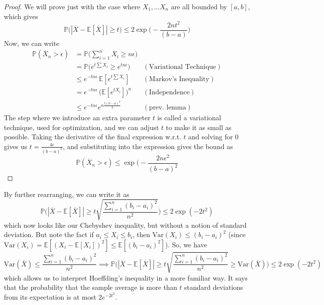 \documentclass{article}
\begin{document}
      \begin{proof}
        We will prove just with the case where $X_1, \ldots X_n$ are all bounded by $[a, b]$, which gives 
        \[\mathbb{P} \big( |\overline{X} - \mathbb{E}[\overline{X}] | \geq t \big) \leq 2 \exp \bigg( - \frac{2 n t^2}{(b - a)}\bigg)\] 
        Now, we can write 
        \begin{align*}
          \mathbb{P}(\overline{X}_n > \epsilon ) & = \mathbb{P} \Big( \sum_{i=1}^n X_i \geq n \epsilon \Big) \\
          & = \mathbb{P} \big( e^{t \sum X_i} \geq e^{t n \epsilon} \big) & (\text{Variational Technique}) \\
          & \leq e^{- t n \epsilon} \, \mathbb{E}[e^{t \sum X_i}] & (\text{Markov's Inequality}) \\
          & = e^{-t n \epsilon} \, \big( \mathbb{E}[ e^{t X_i}] \big)^n & (\text{Independence}) \\
          & \leq e^{-t n \epsilon} e^{n \frac{t (b - a)^2}{2}} & (\text{prev. lemma}) 
        \end{align*}
        The step where we introduce an extra parameter $t$ is called a variational technique, used for optimization, and we can adjust $t$ to make it as small as possible. Taking the derivative of the final expression w.r.t. $t$ and solving for $0$ gives us $t = \frac{4 \epsilon}{(b - a)^2}$, and substituting into the expression gives the bound as 
        \begin{equation}
          \mathbb{P}(\overline{X}_n > \epsilon ) \leq \exp \bigg(- \frac{2 n \epsilon^2}{(b - a)^2}
        \end{equation}
      \end{proof}

      By further rearranging, we can write it as 
      \begin{equation}
        \mathbb{P} \bigg( | \overline{X} - \mathbb{E}[\overline{X}] | \geq t \sqrt{\frac{\sum_{i=1}^n (b_i - a_i)^2}{n^2}} \bigg) \leq 2 \exp(-2t^2)
      \end{equation}
      which now looks like our Chebyshev inequality, but without a notion of standard deviation. But note the fact if $a_i \leq X_i \leq b_i$, then $\mathrm{Var}(X_i) \leq (b_i - a_i)^2$ (since $\mathrm{Var}(X_i) = \mathbb{E}[(X_i - \mathbb{E}[X_i])^2] \leq \mathbb{E}[(b_i - a_i)^2]$). So, we have 
      \begin{equation}
        \mathrm{Var}(\overline{X}) \leq \frac{\sum_{i=1}^n (b_i - a_i)^2}{n^2} \implies \mathbb{P}\bigg( |\overline{X} - \mathbb{E}[\overline{X}] | \geq t \sqrt{\frac{\sum_{i=1}^n (b_i - a_i)^2}{n^2}} \geq \mathrm{Var}(\overline{X}) \bigg) \leq 2\exp(-2t^2)
      \end{equation}
      which allows us to interpret Hoeffding's inequality in a more familiar way. It says that the probability that the sample average is more than $t$ standard deviations from its expectation is at most $2 e^{-2t^2}$. 
\end{document}
